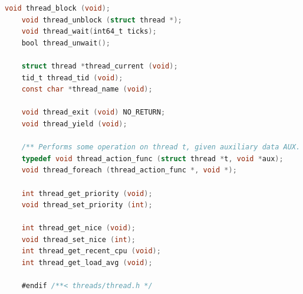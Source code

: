 \documentclass{article}
\begin{document}
\begin{lstlisting}[language=C, title=\texttt{pintos/src/threads/thread.h}]
	void thread_block (void);
	void thread_unblock (struct thread *);
	void thread_wait(int64_t ticks);
	bool thread_unwait();
	
	struct thread *thread_current (void);
	tid_t thread_tid (void);
	const char *thread_name (void);
	
	void thread_exit (void) NO_RETURN;
	void thread_yield (void);
	
	/** Performs some operation on thread t, given auxiliary data AUX. */
	typedef void thread_action_func (struct thread *t, void *aux);
	void thread_foreach (thread_action_func *, void *);
	
	int thread_get_priority (void);
	void thread_set_priority (int);
	
	int thread_get_nice (void);
	void thread_set_nice (int);
	int thread_get_recent_cpu (void);
	int thread_get_load_avg (void);
	
	#endif /**< threads/thread.h */
\end{lstlisting}

\normalsize
\end{document}

